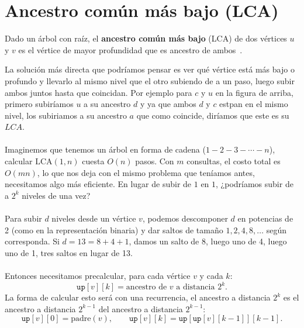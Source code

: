 \section{Ancestro común más bajo (LCA)\adv}
Dado un árbol con raíz, el \textbf{ancestro común más bajo} (LCA) de dos vértices $u$ y $v$ es el vértice de mayor profundidad que es ancestro de ambos~\cite{youtube_lca}.
\begin{figure}[H]
\centering
{}
\end{figure}
La solución más directa que podríamos pensar es ver qué vértice está más bajo o profundo y llevarlo al mismo nivel que el otro subiendo de a un paso, luego subir ambos juntos hasta que coincidan. Por ejemplo para $c$ y $u$ en la figura de arriba, primero subiríamos $u$ a su ancestro $d$ y ya que ambos $d$ y $c$ estpan en el mismo nivel, los subiriamos a su ancestro $a$ que como coincide, diríamos que este es su $LCA$.
\\\\
Imaginemos que tenemos un árbol en forma de cadena ($1 - 2 - 3 - \cdots - n$), calcular $\text{LCA}(1, n)$ cuesta $O(n)$ pasos. Con $m$ consultas, el costo total es $O(mn)$, lo que nos deja con el mismo problema que teníamos antes, necesitamos algo más eficiente. En lugar de subir de $1$ en $1$, ¿podríamos subir de a $2^k$ niveles de una vez?
\\\\
 Para subir $d$ niveles desde un vértice $v$, podemos descomponer $d$ en potencias de 2 (como en la representación binaria) y dar saltos de tamaño $1, 2, 4, 8, \ldots$ según corresponda. Si $d = 13 = 8 + 4 + 1$, damos un salto de 8, luego uno de 4, luego uno de 1, tres saltos en lugar de 13.
\\\\
Entonces necesitamos precalcular, para cada vértice $v$ y cada $k$:
\[
\texttt{up}[v][k] = \text{ancestro de } v \text{ a distancia } 2^k.
\]
La forma de calcular esto será con una recurrencia, el ancestro a distancia $2^k$ es el ancestro a distancia $2^{k-1}$ del ancestro a distancia $2^{k-1}$:
\[
\texttt{up}[v][0] = \text{padre}(v), \qquad \texttt{up}[v][k] = \texttt{up}[\texttt{up}[v][k-1]][k-1].
\]
 
